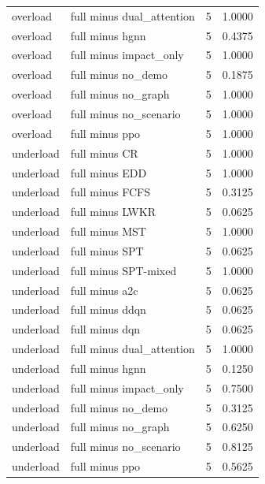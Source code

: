 \begin{tabular}{llll}
overload & full minus dual\_attention & 5 & 1.0000\\
overload & full minus hgnn & 5 & 0.4375\\
overload & full minus impact\_only & 5 & 1.0000\\
overload & full minus no\_demo & 5 & 0.1875\\
overload & full minus no\_graph & 5 & 1.0000\\
overload & full minus no\_scenario & 5 & 1.0000\\
overload & full minus ppo & 5 & 1.0000\\
underload & full minus CR & 5 & 1.0000\\
underload & full minus EDD & 5 & 1.0000\\
underload & full minus FCFS & 5 & 0.3125\\
underload & full minus LWKR & 5 & 0.0625\\
underload & full minus MST & 5 & 1.0000\\
underload & full minus SPT & 5 & 0.0625\\
underload & full minus SPT-mixed & 5 & 1.0000\\
underload & full minus a2c & 5 & 0.0625\\
underload & full minus ddqn & 5 & 0.0625\\
underload & full minus dqn & 5 & 0.0625\\
underload & full minus dual\_attention & 5 & 1.0000\\
underload & full minus hgnn & 5 & 0.1250\\
underload & full minus impact\_only & 5 & 0.7500\\
underload & full minus no\_demo & 5 & 0.3125\\
underload & full minus no\_graph & 5 & 0.6250\\
underload & full minus no\_scenario & 5 & 0.8125\\
underload & full minus ppo & 5 & 0.5625\\
\bottomrule
\end{tabular}